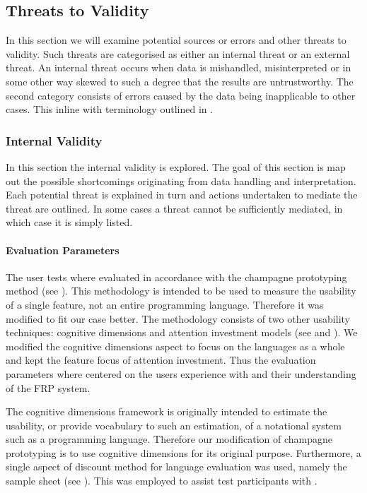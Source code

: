 \subsection{Threats to Validity} \label{sec:validity}
In this section we will examine potential sources or errors and other threats to validity. Such threats are categorised as either an internal threat or an external threat. An internal threat occurs when data is mishandled, misinterpreted or in some other way skewed to such a degree that the results are untrustworthy. The second category consists of errors caused by the data being inapplicable to other cases. This inline with terminology outlined in \cite{mcleod:validity}.


\subsubsection{Internal Validity}
In this section the internal validity is explored. The goal of this section is map out the possible  shortcomings originating from data handling and interpretation. Each potential threat is explained in turn and actions undertaken to mediate the threat are outlined. In some cases a threat cannot be sufficiently mediated, in which case it is simply listed.

\paragraph{Evaluation Parameters}
The user tests where evaluated in accordance with the champagne prototyping method (see ). This methodology is intended to be used to measure the usability of a single feature, not an entire programming language. Therefore it was modified to fit our case better. The methodology consists of two other usability techniques: cognitive dimensions and attention investment models (see  and ). We modified the cognitive dimensions aspect to focus on the languages as a whole and kept the feature focus of attention investment. Thus the evaluation parameters where centered on the users experience with \fs and their understanding of the \gls{FRP} system.

The cognitive dimensions framework is originally intended to  estimate the usability, or provide vocabulary to such an estimation, of a notational system such as a programming language. Therefore our modification of champagne prototyping is to use cognitive dimensions for its original purpose. Furthermore, a single aspect of discount method for language evaluation was used, namely the sample sheet (see ). This was employed to assist test participants with \fs.

